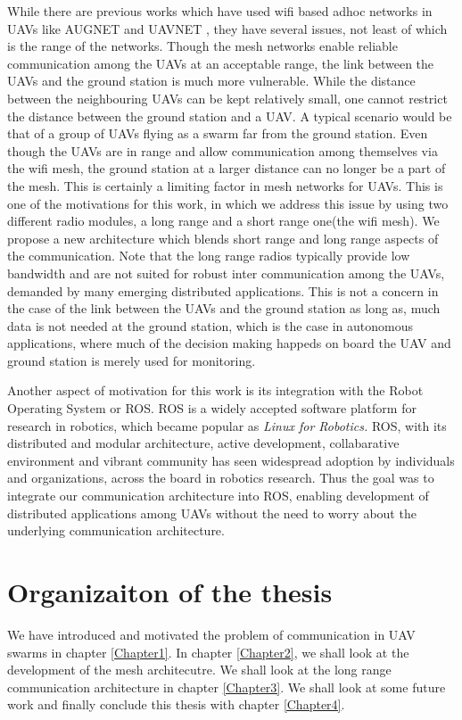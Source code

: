 While there are previous works which have used wifi based adhoc networks in UAVs like AUGNET \cite{augnet} and UAVNET \cite{uavnet}, they have several issues, not least of which is the range of the networks. Though the mesh networks enable reliable communication among the UAVs at an acceptable range, the link between the UAVs and the ground station is much more vulnerable. While the distance between the neighbouring UAVs can be kept relatively small, one cannot restrict the distance between the ground station and a UAV. A typical scenario would be that of a group of UAVs flying as a swarm far from the ground station. Even though the UAVs are in range and allow communication among themselves via the wifi mesh, the ground station at a larger distance can no longer be a part of the mesh. This is certainly a limiting factor in mesh networks for UAVs. This is one of the motivations for this work, in which we address this issue by using two different radio modules, a long range and a short range one(the wifi mesh). We propose a new architecture which blends short range and long range aspects of the communication. Note that the long range radios typically provide low bandwidth and are not suited for robust inter communication among the UAVs, demanded by many emerging distributed applications. This is not a concern in the case of the link between the UAVs and the ground station as long as, much data is not needed at the ground station, which is the case in autonomous applications, where much of the decision making happeds on board the UAV and ground station is merely used for monitoring.

Another aspect of motivation for this work is its integration with the Robot Operating System or ROS. ROS is a widely accepted software platform for research in robotics, which became popular as \textit{Linux for Robotics.} ROS, with its distributed and modular architecture, active development, collabarative environment and vibrant community has seen widespread adoption by individuals and organizations, across the board in robotics research. Thus the goal was to integrate our communication architecture into ROS, enabling development of distributed applications among UAVs without the need to worry about the underlying communication architecture.

\section{Organizaiton of the thesis}
We have introduced and motivated the problem of communication in UAV swarms in chapter \ref{Chapter1}. In chapter \ref{Chapter2}, we shall look at the development of the mesh architecutre. We shall look at the long range communication architecture in chapter \ref{Chapter3}. We shall look at some future work and  finally conclude this thesis with chapter \ref{Chapter4}.